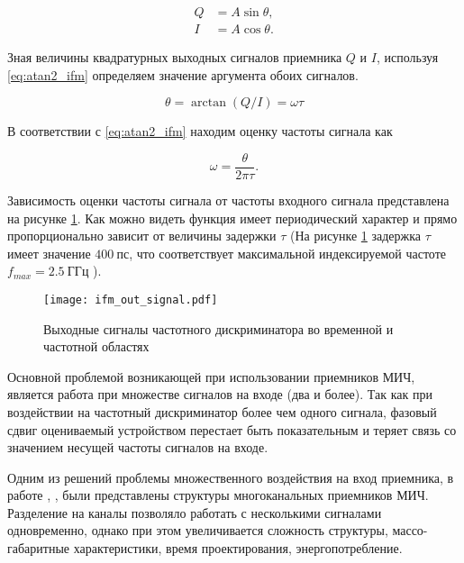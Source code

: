 \begin{equation}
	\begin{aligned}
		Q &= A \sin{\theta}, \\
		I &= A \cos{\theta}.
	\end{aligned}
	\label{eq:quadrature_ifm}
\end{equation}

Зная величины квадратурных выходных сигналов приемника \(Q\) и \(I\), используя \eqref{eq:atan2_ifm} определяем значение аргумента обоих сигналов.

\begin{equation}
	\theta = \arctan(Q/I) = \omega \tau
	\label{eq:atan2_ifm}
\end{equation}

В соответствии с \eqref{eq:atan2_ifm} находим оценку частоты сигнала как

\begin{equation}
	\omega = \frac{\theta}{2 \pi \tau}.
	\label{eq:ifm_freq_estimation}
\end{equation}

Зависимость оценки частоты сигнала от частоты входного сигнала представлена на рисунке \ref{ct:ifm_out_signal}. Как можно видеть функция имеет периодический характер и прямо пропорционально зависит от величины задержки \(\tau\) (На рисунке \ref{ct:ifm_out_signal} задержка \(\tau \) имеет значение \(400~\textrm{пс}\), что соответствует максимальной индексируемой частоте \(f_{max} = 2.5~\textrm{ГГц}\) ).

\begin{figure}[ht]
	\centering
	\texttt{[image: ifm\_out\_signal.pdf]}
	
	\caption{Выходные сигналы частотного дискриминатора во временной и частотной областях}
	\label{ct:ifm_out_signal}
\end{figure}

Основной проблемой возникающей при использовании приемников МИЧ, является работа при множестве сигналов на входе (два и более). Так как при воздействии на частотный дискриминатор более чем одного сигнала, фазовый сдвиг оцениваемый устройством перестает быть показательным и теряет связь со значением несущей частоты сигналов на входе.

Одним из решений проблемы множественного воздействия на вход приемника, в работе \cite{Choi2014}, \cite{gruchalla_instantaneous_2006}, были представлены структуры многоканальных приемников МИЧ. Разделение на каналы позволяло работать с несколькими сигналами одновременно, однако при этом увеличивается сложность структуры, массо-габаритные характеристики, время проектирования, энергопотребление.

